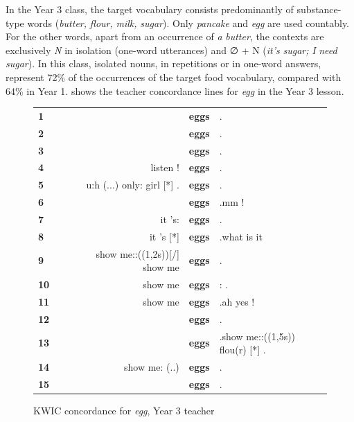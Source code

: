 \documentclass[output=paper,colorlinks,citecolor=brown,modfonts,nonflat]{../langscibook}
\begin{document}
In the Year 3 class, the target vocabulary consists predominantly of substance-type words (\textit{butter,} \textit{flour,} \textit{milk,} \textit{sugar}). Only \textit{pancake} and \textit{egg} are used countably. For the other words, apart from an occurrence of \textit{a} \textit{butter}, the contexts are exclusively \textit{N} in isolation (one-word utterances) and ∅ + N (\textit{it’s} \textit{sugar;} \textit{I} \textit{need} \textit{sugar}). In this class, isolated nouns, in repetitions or in one-word answers, represent 72\% of the occurrences of the target food vocabulary, compared with 64\% in Year 1.  shows the teacher concordance lines for \textit{egg} in the Year 3 lesson.

\begin{figure}
\caption{\label{tabfig:hilton:9}KWIC concordance for  {\textit{egg}},  {Year}  {3}  {teacher}}
\ttfamily\footnotesize
\begin{tabular}{l@{}l@{}lr@{~}l@{~}l}
\lsptoprule
 \textbf{1} &   &  &  & \textbf{eggs} & .\\
 \textbf{2} &   &  &  & \textbf{eggs} & .\\
 \textbf{3} &   &  &  & \textbf{eggs} & .\\
 \textbf{4} &   &  &  listen ! & \textbf{eggs} & .\\
 \textbf{5} &   &  &  u:h (...) only: girl [*] . & \textbf{eggs} & .\\
 \textbf{6} &   &  &  & \textbf{eggs} & .mm !\\
 \textbf{7} &   &  &  it 's: & \textbf{eggs} & .\\
 \textbf{8} &   &  &  it 's [*] & \textbf{eggs} & .what is it\\
 \textbf{9} &   &  &  show me::((1,2s))[/] show me &  \textbf{eggs} & .\\
 \textbf{10} &  &  &  show me & \textbf{eggs} & : .\\
 \textbf{11} &  &  &  show me & \textbf{eggs} & .ah yes !\\
 \textbf{12} &  &  &  & \textbf{eggs} & .\\
 \textbf{13} &  &  &  & \textbf{eggs} & .show me::((1,5s)) flou(r) [*] .\\
 \textbf{14} &  &  &  show me: (..) & \textbf{eggs} & .\\
 \textbf{15} &  &  &  & \textbf{eggs} & .\\

\end{tabular}
\end{figure}
\end{document}

